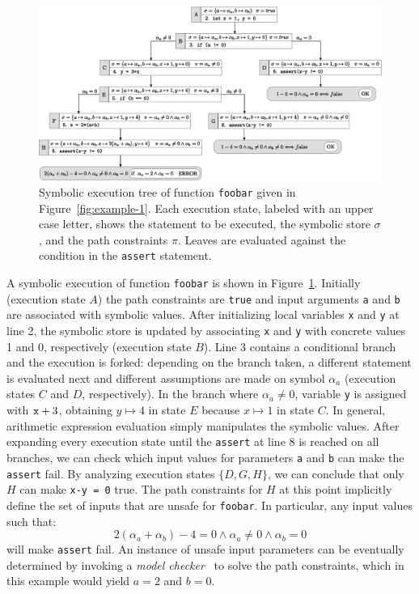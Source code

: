 \begin{figure}[t]
  \centering
  \includegraphics[width=1.0\columnwidth]{images/execution-tree.eps} 
  \caption{Symbolic execution tree of function {\tt foobar} given in Figure~\ref{fig:example-1}. Each execution state, labeled with an upper case letter, shows the statement to be executed, the symbolic store $\sigma$, and the path constraints $\pi$. Leaves are evaluated against the condition in the {\tt assert} statement. }
  \label{fig:example-symbolic-execution}
\end{figure}

\noindent A symbolic execution of function {\tt foobar} is shown in Figure~\ref{fig:example-symbolic-execution}. Initially (execution state $A$) the path constraints are {\tt true} and input arguments {\tt a} and {\tt b} are associated with symbolic values. 
After initializing local variables {\tt x} and {\tt y} at line 2, the symbolic store is updated by associating {\tt x} and {\tt y} with concrete values 1 and 0, respectively (execution state $B$). Line 3 contains a conditional branch and the execution is forked: depending on the branch taken, a different statement is evaluated next and different assumptions are made on symbol $\alpha_a$ (execution states $C$ and $D$, respectively). In the branch where $\alpha_a\neq 0$, variable {\tt y} is assigned with ${\tt x}+3$, obtaining $y\mapsto 4$ in state $E$ because $x\mapsto 1$ in state $C$. In general, arithmetic expression evaluation simply manipulates the symbolic values.
After expanding every execution state until the {\tt assert} at line 8 is reached on all branches, we can check which input values for parameters {\tt a} and {\tt b} can make the {\tt assert} fail. By analyzing execution states $\{D,G,H\}$, we can conclude that only $H$ can make {\tt x-y = 0} true. The path constraints for $H$ at this point implicitly define the set of inputs that are unsafe for {\tt foobar}. 
In particular, any input values such that:
 \[ 2(\alpha_a+\alpha_b)-4 = 0 \wedge \alpha_a \neq 0 \wedge \alpha_b = 0 \]
will make {\tt assert} fail. An instance of unsafe input parameters can be eventually determined by invoking a {\em model checker}~\cite{HandbookOfSAT2009} to solve the path constraints, which in this example would yield $a = 2$ and $b = 0$. 

